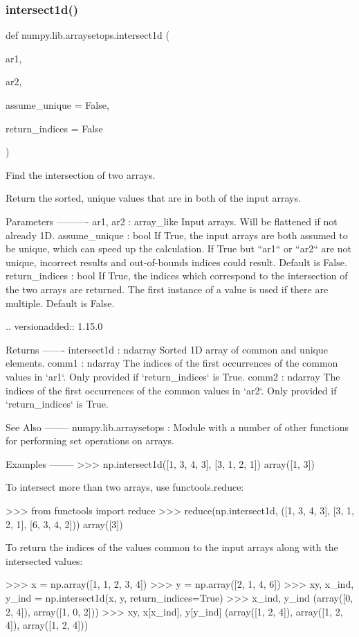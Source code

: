 \subsubsection{\texorpdfstring{intersect1d()}{intersect1d()}}
{\footnotesize\ttfamily def numpy.\+lib.\+arraysetops.\+intersect1d (\begin{DoxyParamCaption}\item[{}]{ar1,  }\item[{}]{ar2,  }\item[{}]{assume\+\_\+unique = {\ttfamily False},  }\item[{}]{return\+\_\+indices = {\ttfamily False} }\end{DoxyParamCaption})}

\begin{DoxyVerb}Find the intersection of two arrays.

Return the sorted, unique values that are in both of the input arrays.

Parameters
----------
ar1, ar2 : array_like
    Input arrays. Will be flattened if not already 1D.
assume_unique : bool
    If True, the input arrays are both assumed to be unique, which
    can speed up the calculation.  If True but ``ar1`` or ``ar2`` are not
    unique, incorrect results and out-of-bounds indices could result.
    Default is False.
return_indices : bool
    If True, the indices which correspond to the intersection of the two
    arrays are returned. The first instance of a value is used if there are
    multiple. Default is False.

    .. versionadded:: 1.15.0

Returns
-------
intersect1d : ndarray
    Sorted 1D array of common and unique elements.
comm1 : ndarray
    The indices of the first occurrences of the common values in `ar1`.
    Only provided if `return_indices` is True.
comm2 : ndarray
    The indices of the first occurrences of the common values in `ar2`.
    Only provided if `return_indices` is True.


See Also
--------
numpy.lib.arraysetops : Module with a number of other functions for
                        performing set operations on arrays.

Examples
--------
>>> np.intersect1d([1, 3, 4, 3], [3, 1, 2, 1])
array([1, 3])

To intersect more than two arrays, use functools.reduce:

>>> from functools import reduce
>>> reduce(np.intersect1d, ([1, 3, 4, 3], [3, 1, 2, 1], [6, 3, 4, 2]))
array([3])

To return the indices of the values common to the input arrays
along with the intersected values:

>>> x = np.array([1, 1, 2, 3, 4])
>>> y = np.array([2, 1, 4, 6])
>>> xy, x_ind, y_ind = np.intersect1d(x, y, return_indices=True)
>>> x_ind, y_ind
(array([0, 2, 4]), array([1, 0, 2]))
>>> xy, x[x_ind], y[y_ind]
(array([1, 2, 4]), array([1, 2, 4]), array([1, 2, 4]))\end{DoxyVerb}
